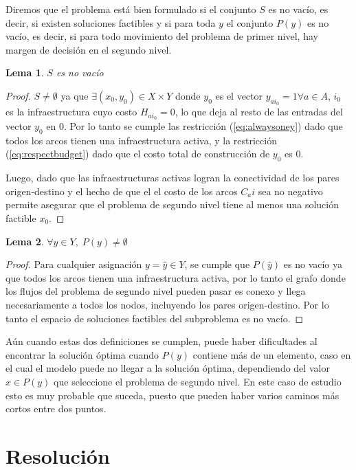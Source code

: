 \documentclass{article}
\newtheorem{lemma}{Lema}
\begin{document}
  Diremos que el problema está bien formulado si el conjunto $S$ es no vacío, es decir, si existen soluciones factibles y si para toda $y$ el conjunto $P(y)$ es no vacío, es decir, si para todo movimiento del problema de primer nivel, hay margen de decisión en el segundo nivel.

  \begin{lemma}$S$ es no vacío
  \end{lemma}

  \begin{proof}
    $S \neq \emptyset$ ya que $\exists (x_0, y_0) \in X \times Y$ donde $y_0$ es el vector $y_{ai_0} = 1 \forall a \in A$, $i_0$ es la infraestructura cuyo costo $H_{ai_0} = 0$, lo que deja al resto de las entradas del vector $y_0$ en $0$. Por lo tanto se cumple las restricción (\ref{eq:alwaysoney}) dado que todos los arcos tienen una infraestructura activa, y la restricción (\ref{eq:respectbudget}) dado que el costo total de construcción de $y_0$ es $0$.

    Luego, dado que las infraestructuras activas logran la conectividad de los pares origen-destino y el hecho de que el el costo de los arcos $C_ai$ sea no negativo permite asegurar que el problema de segundo nivel tiene al menos una solución factible $x_0$.
  \end{proof}

  \begin{lemma}$\forall y \in Y,\; P(y) \neq \emptyset$
  \end{lemma}

  \begin{proof}
    Para cualquier asignación $y = \hat{y} \in Y$, se cumple que $P(\hat{y})$ es no vacío ya que todos los arcos tienen una infraestructura activa, por lo tanto el grafo donde los flujos del problema de segundo nivel pueden pasar es conexo y llega necesariamente a todos los nodos, incluyendo los pares origen-destino. Por lo tanto el espacio de soluciones factibles del subproblema es no vacío. 
  \end{proof}

  Aún cuando estas dos definiciones se cumplen, puede haber dificultades al encontrar la solución óptima cuando $P(y)$ contiene más de un elemento, caso en el cual el modelo puede no llegar a la solución óptima, dependiendo del valor $x \in P(y)$ que seleccione el problema de segundo nivel. En este caso de estudio esto es muy probable que suceda, puesto que pueden haber varios caminos más cortos entre dos puntos.

  \section{Resolución}
\end{document}
